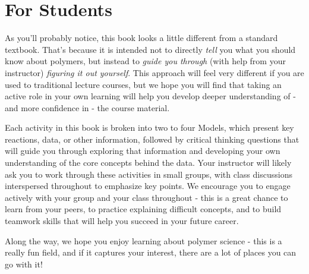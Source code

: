 \section{For Students}

As you'll probably notice, this book looks a little different from a standard textbook.  That's because it is intended not to directly \emph{tell} you what you should know about polymers, but instead to \emph{guide you through} (with help from your instructor) \emph{figuring it out yourself}.  This approach will feel very different if you are used to traditional lecture courses, but we hope you will find that taking an active role in your own learning will help you develop deeper understanding of - and more confidence in - the course material. %

Each activity in this book is broken into two to four Models, which present key reactions, data, or other information, followed by critical thinking questions that will guide you through exploring that information and developing your own understanding of the core concepts behind the data.
Your instructor will likely ask you to work through these activities in small groups, with class discussions interspersed throughout to emphasize key points.  We encourage you to engage actively with your group and your class throughout - this is a great chance to learn from your peers, to practice explaining difficult concepts, and to build teamwork skills that will help you succeed in your future career.

Along the way, we hope you enjoy learning about polymer science - this is a really fun field, and if it captures your interest, there are a lot of places you can go with it!